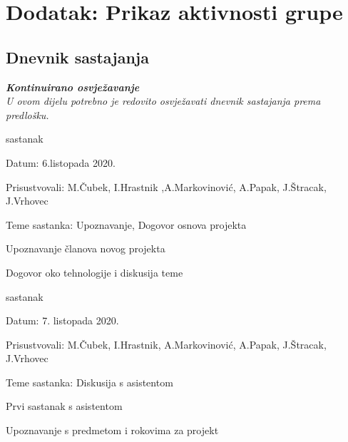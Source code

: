 \chapter*{Dodatak: Prikaz aktivnosti grupe}
		
		\section*{Dnevnik sastajanja}
		
		\textbf{\textit{Kontinuirano osvježavanje}}\\
		
		 \textit{U ovom dijelu potrebno je redovito osvježavati dnevnik sastajanja prema predlošku.}
		
		\begin{packed_enum}
			\item  sastanak
			
			\item[] \begin{packed_item}
				\item Datum: 6.listopada 2020.
				\item Prisustvovali: M.Čubek, I.Hrastnik ,A.Markovinović, A.Papak, J.Štracak, J.Vrhovec
				\item Teme sastanka: Upoznavanje, Dogovor osnova projekta
				\begin{packed_item}
					\item  Upoznavanje članova novog projekta
					\item  Dogovor oko tehnologije i diskusija teme
				\end{packed_item}
			\end{packed_item}
			
			\item  sastanak
			\item[] \begin{packed_item}
				\item Datum: 7. listopada 2020.
				\item Prisustvovali: M.Čubek, I.Hrastnik, A.Markovinović, A.Papak, J.Štracak, J.Vrhovec
				\item Teme sastanka: Diskusija s asistentom
				\begin{packed_item}
					\item  Prvi sastanak s asistentom
					\item  Upoznavanje s predmetom i rokovima za projekt
				\end{packed_item}
			\end{packed_item}
		

\end{packed_enum}
